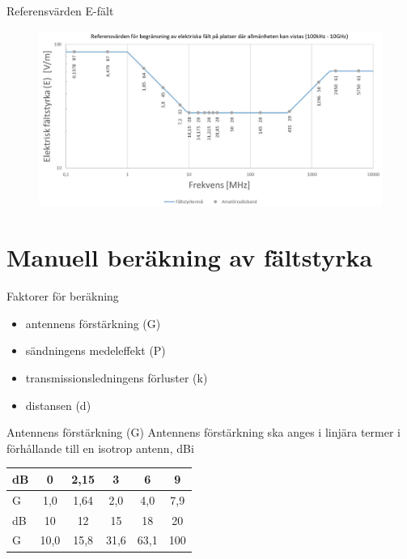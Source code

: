 \documentclass{beamer}
\begin{document}
\begin{frame}{Referensvärden E-fält}
\begin{figure}[h]
\includegraphics[width=\textwidth]{images/emfbild-000.png}
\end{figure}
\end{frame}

\section{Manuell beräkning av fältstyrka}

\begin{frame}{Faktorer för beräkning}
\begin{itemize}
	\item antennens förstärkning (G)
	\item sändningens medeleffekt (P)
	\item transmissionsledningens förluster (k)
	\item distansen (d)
\end{itemize}
\end{frame}

\begin{frame}{Antennens förstärkning (G)}
Antennens förstärkning ska anges i linjära termer i förhållande till en isotrop
antenn, dBi

\begin{tabular}{|l|ccccc|}
	\hline
	dB     &  0  & 2,15 &  3  &  6  &  9  \\ \hline
	G & 1,0 & 1,64 & 2,0 & 4,0 & 7,9 \\ \hline
	dB     &  10  &  12  &  15  &  18  &  20 \\ \hline
	G & 10,0 & 15,8 & 31,6 & 63,1 & 100 \\ \hline
\end{tabular}
\end{frame}
\end{document}
